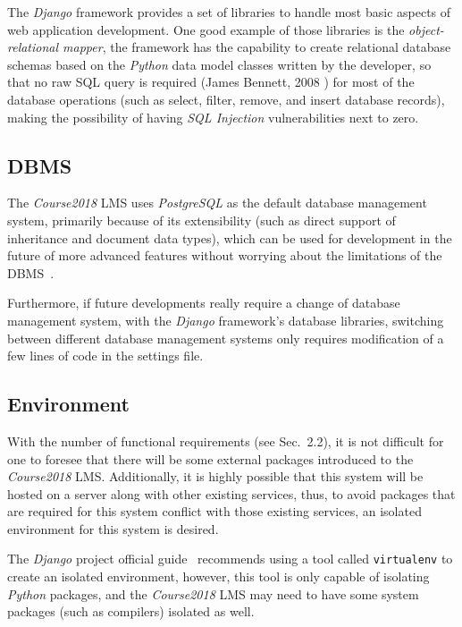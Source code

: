 The \emph{Django} framework provides a set of libraries to handle most basic
aspects of web application development. One good example of those libraries is
the \emph{object-relational mapper}, the framework has the capability to create
relational database schemas based on the \emph{Python} data model classes
written by the developer, so that no raw SQL query is required
(James Bennett, 2008 \cite{django}) for most of the
database operations (such as select, filter, remove, and insert database
records),
making the possibility of having \emph{SQL Injection} vulnerabilities next
to zero.

\subsection{DBMS}
The \emph{Course2018} LMS uses \emph{PostgreSQL} as the default database
management system, primarily because of its extensibility (such as direct
support of inheritance and document data types), which can be used for
development in the future of more advanced features without worrying about the
limitations of the DBMS~\cite{postgres}.

\medskip

Furthermore, if future developments really require a change of database
management system,
with the \emph{Django} framework's database libraries,
switching between different database management systems only requires
modification of a few lines of code in the settings file.

\subsection{Environment}
With the number of functional requirements (see Sec.~2.2), it is not difficult for
one to foresee that there will be some external packages introduced to the
\emph{Course2018} LMS.
Additionally, it is highly possible that this system will be hosted
on a server along with other existing services, thus, to avoid packages that
are required for this system conflict with those existing services, an
isolated environment for this system is desired.

\medskip
The \emph{Django} project official guide~\cite{djangoGuide} recommends using
a tool called \texttt{virtualenv} to create an isolated environment, however,
this tool is only capable of isolating \emph{Python} packages, and the
\emph{Course2018} LMS may need to have some system packages (such as
compilers) isolated as well.


